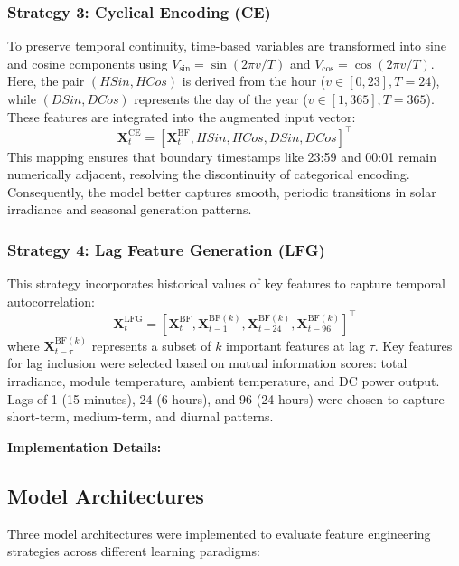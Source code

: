 \documentclass[conference]{IEEEtran}
\begin{document}
	\subsubsection{Strategy 3: Cyclical Encoding (CE)}
	To preserve temporal continuity, time-based variables are transformed into sine and cosine components using $V_{\sin} = \sin(2\pi v/T)$ and $V_{\cos} = \cos(2\pi v/T)$. Here, the pair $(HSin, HCos)$ is derived from the hour ($v \in [0, 23], T=24$), while $(DSin, DCos)$ represents the day of the year ($v \in [1, 365], T=365$). These features are integrated into the augmented input vector:
	\begin{equation*}
		\mathbf{X}_t^{\text{CE}} = [\mathbf{X}_t^{\text{BF}}, HSin, HCos, DSin, DCos]^\top
	\end{equation*}
	This mapping ensures that boundary timestamps like 23:59 and 00:01 remain numerically adjacent, resolving the discontinuity of categorical encoding. Consequently, the model better captures smooth, periodic transitions in solar irradiance and seasonal generation patterns.
	
	\subsubsection{Strategy 4: Lag Feature Generation (LFG)}
	This strategy incorporates historical values of key features to capture temporal autocorrelation:
	\begin{equation*}
		\mathbf{X}_t^{\text{LFG}} = [\mathbf{X}_t^{\text{BF}}, \mathbf{X}_{t-1}^{\text{BF}(k)}, \mathbf{X}_{t-24}^{\text{BF}(k)}, \mathbf{X}_{t-96}^{\text{BF}(k)}]^\top
	\end{equation*}
	where $\mathbf{X}_{t-\tau}^{\text{BF}(k)}$ represents a subset of $k$ important features at lag $\tau$. Key features for lag inclusion were selected based on mutual information scores: total irradiance, module temperature, ambient temperature, and DC power output. Lags of 1 (15 minutes), 24 (6 hours), and 96 (24 hours) were chosen to capture short-term, medium-term, and diurnal patterns.
	
	\textbf{Implementation Details:}
	
	\subsection{Model Architectures}
	Three model architectures were implemented to evaluate feature engineering strategies across different learning paradigms:
	
\end{document}
